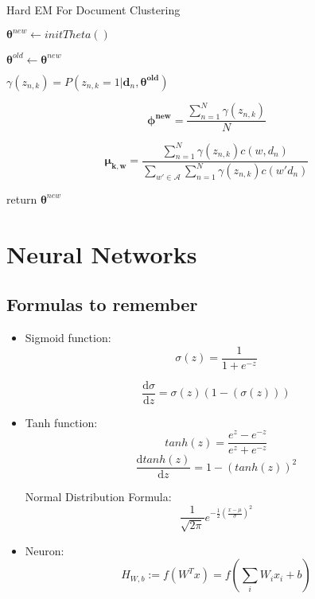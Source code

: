 \documentclass[a4paper]{article}
\begin{document}
	\begin{algorithm}
		\caption{Hard EM For Document Clustering}
		\begin{algorithmic}[1]
			
			\State $\mathbf{\theta}^{new} \gets initTheta()$ 
			
			\Do
			\State $\mathbf{\theta}^{old} \gets \mathbf{\theta}^{new}$
			
			
			
			\State $\gamma(z_{n,k}) = P(z_{n,k} = 1 | \mathbf{d}_n, \mathbf{\theta^{old}})$ 
			
			\State $$\mathbf{\phi^{new}} = \frac{\sum^{N}_{n=1}\gamma(z_{n,k})}{N}$$
			
			\State $$\mathbf{\mu_{k,w}} = 
			\frac
			{\sum^{N}_{n=1}\gamma(z_{n,k})c(w, d_n)} {\sum_{w' \in \mathcal{A}} \sum^{N}_{n=1} \gamma(z_{n,k})c(w' d_n)}$$ 
			
			\EndFor
			
			\EndFor
			
			
			\State return {$\mathbf{\theta}^{new}$}
			
			\EndProcedure
		\end{algorithmic}
	\end{algorithm}
	
	\clearpage
	\section{Neural Networks}
    
    \subsection{Formulas to remember}
    
    \begin{itemize}
     \item Sigmoid function: $$ \sigma(z) = \frac{1}{1 + e^{-z}}$$ 
     
     $$\dfrac{\mathrm{d}\sigma}{\mathrm{d}z} = \sigma(z)(1-(\sigma(z)))$$
    
     \item Tanh function: $$ tanh(z) = \frac{e^z-e^{-z}}{e^{z}+e^{-z}} $$
     $$\dfrac{\mathrm{d}tanh(z)}{\mathrm{d}z} = 1-(tanh(z))^2$$
     
     Normal Distribution Formula:
     $$\frac{1}{\sqrt{2\pi}} e^{-\frac{1}{2}(\frac{x - \mu}{\sigma})^2}$$
     
     \item Neuron: $$ H_{W,b} := f(W^Tx) = f(\sum_i W_ix_i + b)$$
    \end{itemize}
    
\end{document}
